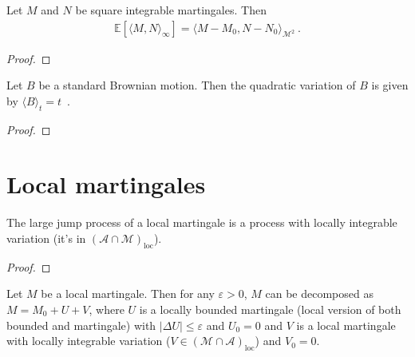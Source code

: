 \begin{lemma}\label{lem:covariation_eq_inner}
Let $M$ and $N$ be square integrable martingales. Then
\begin{align*}
  \mathbb{E}\left[\langle M,N \rangle_\infty\right] = \langle M - M_0, N - N_0 \rangle_{\mathcal{M}^2}
  \: .
\end{align*}
\end{lemma}

\begin{proof}

\end{proof}


\begin{lemma}\label{lem:quadraticVariation_brownian}
Let $B$ be a standard Brownian motion. Then the quadratic variation of $B$ is given by $\langle B \rangle_t = t$~.
\end{lemma}

\begin{proof}

\end{proof}




\section{Local martingales}

\begin{lemma}\label{lem:IsLocalMartingale.locally_hasIntegrableVariation_largeJumps}
The large jump process of a local martingale is a process with locally integrable variation (it's in $(\mathcal{A} \cap \mathcal{M})_{\mathrm{loc}}$).
\end{lemma}

\begin{proof}

\end{proof}


\begin{theorem}\label{thm:local_martingale_decomposition}
Let $M$ be a local martingale.
Then for any $\varepsilon > 0$, $M$ can be decomposed as $M = M_0 + U + V$, where $U$ is a locally bounded martingale (local version of both bounded and martingale) with $\vert \Delta U \vert \le \varepsilon$ and $U_0 = 0$ and $V$ is a local martingale with locally integrable variation ($V \in (\mathcal{M} \cap \mathcal{A})_{\mathrm{loc}}$) and $V_0 = 0$.
\end{theorem}


